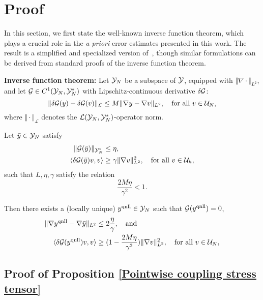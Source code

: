 \section{Proof}
\label{sec: appendix}
\renewcommand{\theequation}{A.\arabic{equation}}

In this section, we first state the well-known inverse function theorem, which plays a crucial role in the {\it a priori} error estimates presented in this work. The result is a simplified and specialized version of~\cite[Lemma 2.2]{2011_CO_1D_QNL_MATHCOMP}, though similar formulations can be derived from standard proofs of the inverse function theorem.

\begin{lemma}\label{Inverse function theorem}
	\textbf{Inverse function theorem: }Let $\mathcal{Y}_{N}$ be a subspace of $\mathcal{Y}$, equipped with $\Vert \nabla \cdot \Vert_{L^{2}}$, and let $\mathcal{G} \in C^{1}(\mathcal{Y}_{N},\mathcal{Y}_{N}^{*})$ with Lipschitz-continuous derivative $\delta \mathcal{G}$:
	\begin{equation*}
		\Vert\delta\mathcal{G}(y) - \delta\mathcal{G}(v)\Vert_\mathcal{L} \le M \Vert \nabla y - \nabla v \Vert_{L^{2}}, \quad \text{for all} \  v \in \mathcal{U}_{N},
	\end{equation*}
	where $\Vert \cdot \Vert_{\mathcal{L}}$ denotes the $\mathcal{L}(\mathcal{Y}_{N},\mathcal{Y}_{N}^{*})$-operator norm.
	
	Let $\bar{y}\in \mathcal{Y}_{N}$ satisfy
	\begin{align}
		\Vert \mathcal{G}(\bar{y})\Vert_{\mathcal{Y}_{N}^{*}} &\le \eta,\\
		\langle \delta \mathcal{G} (\bar{y})v,v\rangle &\ge \gamma \Vert \nabla v \Vert^{2}_{L^{2}},  \quad \text{for all} \ v \in \mathcal{U}_{h},
	\end{align}
	such that $L,\eta,\gamma$ satisfy the relation
	\begin{equation}
		\frac{2M\eta}{\gamma^{2}}<1.
	\end{equation}
	
	Then there exists a (locally unique) $y^{{\rm qnll}}\in \mathcal{Y}_{N}$ such that $\mathcal{G}(y^{{\rm qnll}})=0$,
	\begin{align}
		\Vert \nabla y^{{\rm qnll}}-\nabla \bar{y}\Vert_{L^{2}} &\le 2\frac{\eta}{\gamma}, \quad \text{and}\\
		\langle \delta \mathcal{G} (y^{{\rm qnll}})v,v\rangle &\ge (1-\frac{2M\eta}{\gamma^{2}}) \Vert \nabla v \Vert^{2}_{L^{2}},  \quad \text{for all} \ v \in \mathcal{U}_{N},
	\end{align}
\end{lemma}


\subsection{Proof of Proposition \ref{Pointwise coupling stress tensor}}
\label{Appendix section 1}

